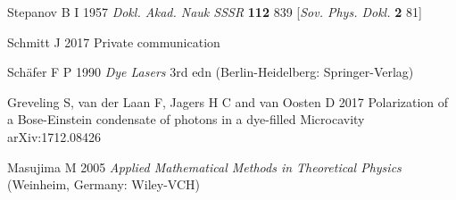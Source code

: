 \documentclass[12pt, a4paper]{iopart}
\begin{document}
\begin{thebibliography}{84}
Stepanov B I 1957 {\it Dokl. Akad. Nauk SSSR} {\bf 112} 839 [{\it Sov. Phys. Dokl.} {\bf 2} 81]

Schmitt J 2017 Private communication

Sch\"afer F P 1990 {\it Dye Lasers} 3rd edn (Berlin-Heidelberg: Springer-Verlag)

Greveling S, van der Laan F, Jagers H C and van Oosten D 2017 Polarization of a Bose-Einstein condensate of photons in a dye-filled Microcavity
arXiv:1712.08426

Masujima M 2005
{\it Applied Mathematical Methods in Theoretical Physics} (Weinheim, Germany: Wiley-VCH)

\end{thebibliography}
\end{document}
